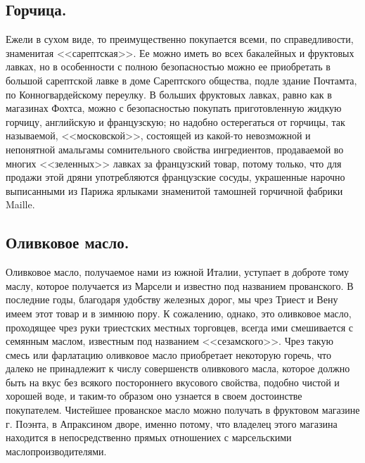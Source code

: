 \subsection{Горчица.}
Ежели в сухом виде, то преимущественно покупается всеми, по справедливости, знаменитая <<сарептская>>. Ее можно иметь во всех бакалейных и фруктовых лавках, но в особенности с полною безопасностью можно ее приобретать в большой сарептской лавке в доме Сарептского общества, подле здание Почтамта, по Конногвардейскому переулку. В больших фруктовых лавках, равно как в магазинах Фохтса, можно с безопасностью покупать приготовленную жидкую горчицу, английскую и французскую; но надобно остерегаться от горчицы, так называемой, <<московской>>, состоящей из какой-то невозможной и непонятной амальгамы сомнительного свойства ингредиентов, продаваемой во многих <<зеленных>> лавках за французский товар, потому только, что для продажи этой дряни употребляются французские сосуды, украшенные нарочно выписанными из Парижа ярлыками знаменитой тамошней горчичной фабрики Maille.

\subsection{Оливковое масло.}
Оливковое масло, получаемое нами из южной Италии, уступает в доброте тому маслу, которое получается из Марсели и известно под названием прованского. В последние годы, благодаря удобству железных дорог, мы чрез Триест и Вену имеем этот товар и в зимнюю пору. К сожалению, однако, это оливковое масло, проходящее чрез руки триестских местных торговцев, всегда ими смешивается с семянным маслом, известным под названием <<сезамского>>. Чрез такую смесь или фарлатацию оливковое масло приобретает некоторую горечь, что далеко не принадлежит к числу совершенств оливкового масла, которое должно быть на вкус без всякого постороннего вкусового свойства, подобно чистой и хорошей воде, и таким-то образом оно узнается в своем достоинстве покупателем. Чистейшее прованское масло можно получать в фруктовом магазине г. Поэнта, в Апраксином дворе, именно потому, что владелец этого магазина находится в непосредственно прямых отношениех с марсельскими маслопроизводителями.

